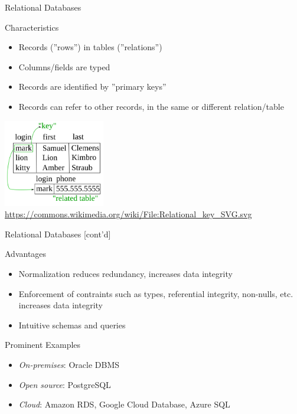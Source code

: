 \documentclass[ignorenonframetext,xcolor=x11names]{beamer}
\begin{document}
\begin{frame}{Relational Databases}
\begin{block}{Characteristics}
\begin{itemize}
	\item Records (''rows'') in tables (''relations'')
	\item Columns/fields are typed
	\item Records are identified by ''primary keys''
	\item Records can refer to other records, in the same or different relation/table
\end{itemize}
\end{block}
\centering
\includegraphics[height=1.5in]{Relational_key.png}
\tiny{\url{https://commons.wikimedia.org/wiki/File:Relational_key_SVG.svg}}
\end{frame}

\begin{frame}{Relational Databases \small [cont'd]}
\begin{block}{Advantages}
\begin{itemize}
	\item Normalization reduces redundancy, increases data integrity
	\item Enforcement of contraints such as types, referential integrity, non-nulls, etc. increases data integrity
	\item Intuitive schemas and queries
\end{itemize}
\end{block}

\begin{block}{Prominent Examples}
\begin{itemize}
	\item \emph{On-premises}: Oracle DBMS
	\item \emph{Open source}: PostgreSQL
	\item \emph{Cloud}: Amazon RDS, Google Cloud Database, Azure SQL
\end{itemize}
\end{block}
\end{frame}
\end{document}
